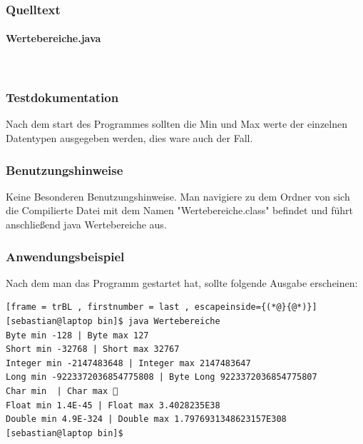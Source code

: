 \subsubsection{Quelltext}
\paragraph{Wertebereiche.java}\



\subsubsection{Testdokumentation}
Nach dem start des Programmes sollten die Min und Max werte der einzelnen Datentypen ausgegeben
werden, dies ware auch der Fall.

\subsubsection{Benutzungshinweise}
Keine Besonderen Benutzungshinweise.
Man navigiere zu dem Ordner von sich die Compilierte Datei mit dem Namen "Wertebereiche.class"
\space befindet und führt anschlie\ss end java Wertebereiche aus.

\subsubsection{Anwendungsbeispiel}
Nach dem man das Programm gestartet hat, sollte folgende Ausgabe erscheinen:
\begin{lstlisting}[frame = trBL , firstnumber = last , escapeinside={(*@}{@*)}]
[sebastian@laptop bin]$ java Wertebereiche
Byte min -128 | Byte max 127
Short min -32768 | Short max 32767
Integer min -2147483648 | Integer max 2147483647
Long min -9223372036854775808 | Byte Long 9223372036854775807
Char min  | Char max ￿
Float min 1.4E-45 | Float max 3.4028235E38
Double min 4.9E-324 | Double max 1.7976931348623157E308
[sebastian@laptop bin]$ 
\end{lstlisting}